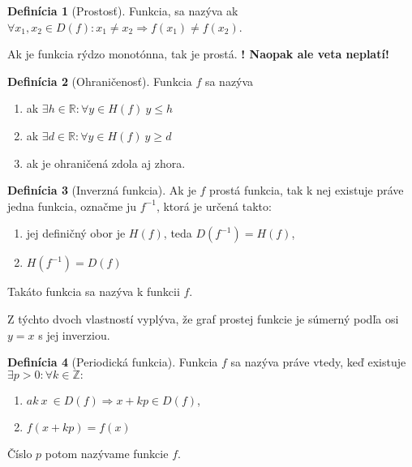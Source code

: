 \documentclass[12pt, twopage]{article}
\theoremstyle{definition}
\newtheorem{definition}{Definícia}
\begin{document}
 	\begin{definition}[Prostosť]
 		Funkcia, sa nazýva  ak $\forall x_1, x_2 \in D(f): x_1 \neq x_2 \Rightarrow f(x_1) \neq f(x_2)$.
 	\end{definition}
 	
 	Ak je funkcia rýdzo monotónna, tak je prostá. \textbf{! Naopak ale veta neplatí!}
 	
 	\begin{definition}[Ohraničenosť]
 		Funkcia $f$ sa nazýva \\
 		\begin{enumerate}
 			\item {} ak $\exists h \in \mathbb{R}: \forall y \in H(f) ~ y \le h$
 			\item {} ak $\exists d \in \mathbb{R}: \forall y \in H(f) ~ y \ge d$
 			\item {} ak je ohraničená zdola aj zhora.
 			
 		\end{enumerate}
 	\end{definition}
 	
 	\begin{definition}[Inverzná funkcia]
 		Ak je $f$ prostá funkcia, tak k nej existuje práve jedna funkcia, označme ju $f^{-1}$, ktorá je určená takto:
 		\begin{enumerate}
 			\item jej definičný obor je $H(f)$, teda $D(f^{-1}) = H(f)$,
 			\item $H(f^{-1}) = D(f)$
 		\end{enumerate}
 		Takáto funkcia sa nazýva  k funkcii $f$.
 	\end{definition}
 	
 	Z týchto dvoch vlastností vyplýva, že graf prostej funkcie je súmerný podľa osi $y = x$ s jej inverziou.
 	
 	\begin{definition}[Periodická funkcia]
 		Funkcia $f$ sa nazýva  práve vtedy, keď existuje $\exists p > 0: \forall k \in \mathbb{Z}:$
 		\begin{enumerate}
 			\item $ak ~ x ~ \in D(f) \Rightarrow x + kp \in D(f)$,
 			\item $f(x + kp) = f(x)$
 		\end{enumerate}
 		Číslo $p$ potom nazývame  funkcie $f$.
 	\end{definition}
 	
\end{document}
